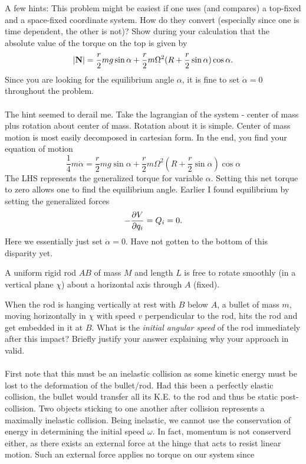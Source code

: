 \documentclass[11pt,letterpaper]{article}
\begin{document}
		A few hints: This problem might be easiest if one uses (and compares) a top-fixed and a space-fixed coordinate system. How do they 
		convert (especially since one is time dependent, the other is not)? Show during your calculation that the absolute value of the torque
		on the top is given by 
		\[
			|\vect N| = \frac{r}{2}mg\sin\alpha+\frac{r}{2}m\Omega^2(R+\frac{r}{2}\sin\alpha)\cos\alpha.
		\]
		Since you are looking for the equilibrium angle $\alpha$, it is fine to set $\dot\alpha = 0$ throughout the problem. 
		\\
		\\
		The hint seemed to derail me. Take the lagrangian of the system - center of mass plus rotation about center of mass. Rotation
		about it is simple. Center of mass motion is most easily decomposed in cartesian form. In the end, you find your equation of motion
		\[
			\frac{1}{4}m\ddot{\alpha} = \frac{r}{2}mg\sin\alpha+\frac{r}{2}m\Omega^2(R+\frac{r}{2}\sin\alpha)\cos\alpha
		\]
		The LHS represents the generalized torque for variable $\alpha$. Setting this net torque to zero allows one to find the
		equilibrium angle. Earlier I found equilibrium by setting the generalized forces
		\[
			-\pdiff[V]{q_i} = Q_i = 0.
		\]
		Here we essentially just set $\dot\alpha = 0$. Have not gotten to the bottom of this disparity yet. 
		\item A uniform rigid rod $AB$ of mass $M$ and length $L$ is free to rotate smoothly (in a vertical plane $\chi$) about a
		horizontal axis through $A$ (fixed).
		\benum
			\item
			When the rod is hanging vertically at rest with $B$ below $A$, a bullet of mass $m$, moving horizontally in $\chi$ with
			speed $v$ perpendicular to the rod, hits the rod and get embedded in it at $B$. What is the \emph{initial angular speed} 
			of the rod immediately after this impact? Briefly justify your answer explaining why your approach in valid.
			\\
			\\
			First note that this must be an inelastic collision as some kinetic energy must be lost to the deformation of the bullet/rod. 
			Had this been a perfectly elastic collision, the bullet would transfer all its K.E. to the rod and thus be static post-collision. 
			Two objects sticking to one another after collision represents a maximally inelastic collision. Being inelastic, we cannot use 
			the conservation of energy in determining the initial speed $\omega$. In fact, momentum is not conserverd either, as there
			exists an external force at the hinge that acts to resist linear motion. Such an external force applies no torque on our system since 
\end{document}
